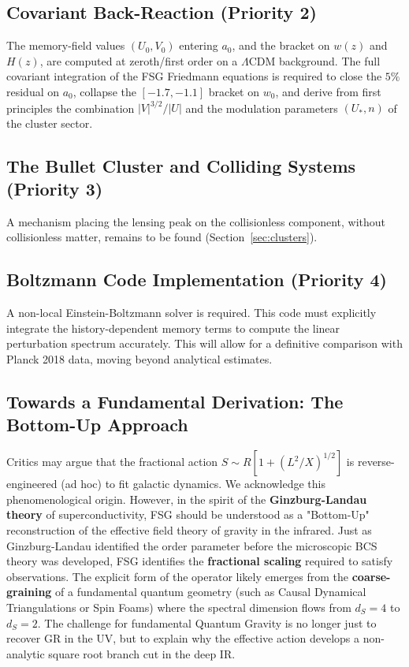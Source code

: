 \documentclass[11pt,a4paper]{article}
\begin{document}
\begin{onehalfspacing}
\subsection{Covariant Back-Reaction (Priority 2)}
The memory-field values $(U_0, V_0)$ entering $a_0$, and the bracket on $w(z)$ and $H(z)$, are computed at zeroth/first order on a $\Lambda$CDM background. The full covariant integration of the FSG Friedmann equations is required to close the $5\%$ residual on $a_0$, collapse the $[-1.7,-1.1]$ bracket on $w_0$, and derive from first principles the combination $|V|^{3/2}/|U|$ and the modulation parameters $(U_*,n)$ of the cluster sector.
\subsection{The Bullet Cluster and Colliding Systems (Priority 3)}
A mechanism placing the lensing peak on the collisionless component, without collisionless matter, remains to be found (Section~\ref{sec:clusters}).
\subsection{Boltzmann Code Implementation (Priority 4)}
A non-local Einstein-Boltzmann solver is required. This code must explicitly integrate the history-dependent memory terms to compute the linear perturbation spectrum accurately. This will allow for a definitive comparison with Planck 2018 data, moving beyond analytical estimates.
\subsection{Towards a Fundamental Derivation: The Bottom-Up Approach}
Critics may argue that the fractional action $S \sim R[1+(L^2/X)^{1/2}]$ is reverse-engineered (ad hoc) to fit galactic dynamics. We acknowledge this phenomenological origin. However, in the spirit of the \textbf{Ginzburg-Landau theory} of superconductivity, FSG should be understood as a "Bottom-Up" reconstruction of the effective field theory of gravity in the infrared.
Just as Ginzburg-Landau identified the order parameter before the microscopic BCS theory was developed, FSG identifies the \textbf{fractional scaling} required to satisfy observations. The explicit form of the operator likely emerges from the \textbf{coarse-graining} of a fundamental quantum geometry (such as Causal Dynamical Triangulations or Spin Foams) where the spectral dimension flows from $d_S=4$ to $d_S=2$.
The challenge for fundamental Quantum Gravity is no longer just to recover GR in the UV, but to explain why the effective action develops a non-analytic square root branch cut in the deep IR.

\end{onehalfspacing}
\end{document}
